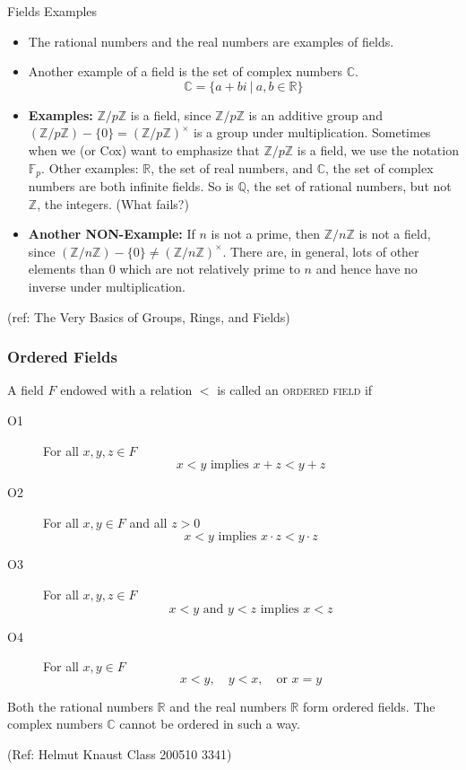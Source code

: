 \begin{frame}{Fields Examples}

\begin{itemize}

\item The rational numbers and the real numbers are examples of fields.
\item Another example of a field is the set of complex numbers ${\mathbb C}$.
\[{\mathbb C}=\{a+bi \ |\ a,b\in {\mathbb R}\}\]

\item {\bf Examples:} ${\mathbb Z} / p {\mathbb Z}$ is a field, since ${\mathbb Z} / p {\mathbb Z}$ is an additive group and $({\mathbb Z} / p {\mathbb Z}) - \{ 0 \} = ({\mathbb Z} / p {\mathbb Z})^\times$ is a group under multiplication. Sometimes when we (or Cox) want to emphasize that ${\mathbb Z} / p {\mathbb Z}$ is a field, we use the notation ${\mathbb F}_p$. Other examples: ${\mathbb R}$, the set of real numbers, and ${\mathbb C}$, the set of complex numbers are both infinite fields. So is ${\mathbb Q}$, the set of rational numbers, but not ${\mathbb Z}$, the integers. (What fails?)
\item {\bf Another NON-Example:} If $n$ is not a prime, then ${\mathbb Z} / n {\mathbb Z}$ is not a field, since $({\mathbb Z} / n {\mathbb Z}) - \{ 0 \} \ne ({\mathbb Z} / n {\mathbb Z})^\times$. There are, in general, lots of other elements than 0 which are not relatively prime to $n$ and hence have no inverse under multiplication.
\end{itemize}


\tiny{(ref: The Very Basics of Groups, Rings, and Fields)}

\end{frame}

 \begin{frame}[fragile]\frametitle{Ordered Fields}


A field $F$ endowed with a relation $<$ is called an
\textsc{ordered field} if
\begin{description}
\item[O1] For all $x,y,z\in F$
\[x<y \mbox{ implies } x+z<y+z\]
\item[O2] For all $x,y\in F$ and all $z>0$
\[x<y \mbox{ implies } x\cdot z<y\cdot z\]
\item[O3] For all $x,y,z\in F$
\[x<y \mbox{ and } y<z \mbox{ implies }x<z\]

\item[O4] For all $x,y\in F$
\[x<y,\quad y<x,\quad \mbox{or } x=y\]
\end{description}

Both the rational numbers ${\mathbb R}$ and the real numbers ${\mathbb R}$
form ordered fields. The complex numbers ${\mathbb C}$ cannot be ordered
in such a way.

\tiny{(Ref: Helmut Knaust Class 200510 3341)}

\end{frame}

